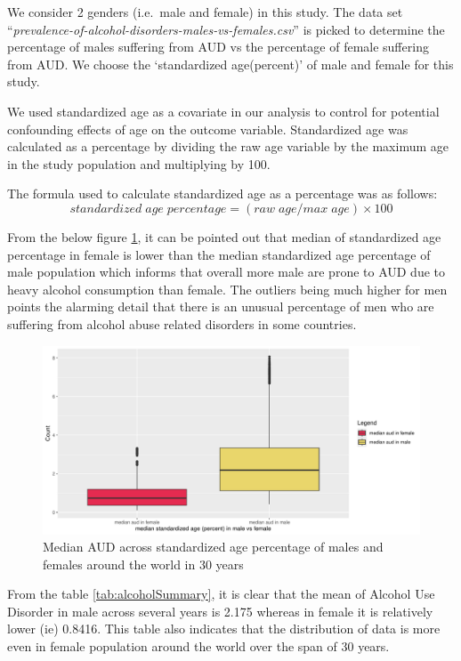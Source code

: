 \documentclass[11pt,a4paper,]{article}
\begin{document}
We consider 2 genders (i.e.~male and female) in this study. The data set ``\emph{prevalence-of-alcohol-disorders-males-vs-females.csv}'' is picked to determine the percentage of males suffering from AUD vs the percentage of female suffering from AUD. We choose the `standardized age(percent)' of male and female for this study.

We used standardized age as a covariate in our analysis to control for potential confounding effects of age on the outcome variable. Standardized age was calculated as a percentage by dividing the raw age variable by the maximum age in the study population and multiplying by 100.

The formula used to calculate standardized age as a percentage was as follows:
\begin{equation}
standardized\;age\;percentage = (raw\;age / max\;age) \times 100
\end{equation}

From the below figure \ref{fig:aud1}, it can be pointed out that median of standardized age percentage in female is lower than the median standardized age percentage of male population which informs that overall more male are prone to AUD due to heavy alcohol consumption than female. The outliers being much higher for men points the alarming detail that there is an unusual percentage of men who are suffering from alcohol abuse related disorders in some countries.

\begin{figure}

{\centering \includegraphics[width=0.7\linewidth]{alcohol_analysis_files/figure-latex/aud1-1} 

}

\caption{Median AUD across standardized age percentage of males and females around the world in 30 years}\label{fig:aud1}
\end{figure}

From the table \ref{tab:alcoholSummary}, it is clear that the mean of Alcohol Use Disorder in male across several years is 2.175 whereas in female it is relatively lower (ie) 0.8416. This table also indicates that the distribution of data is more even in female population around the world over the span of 30 years.
\end{document}
